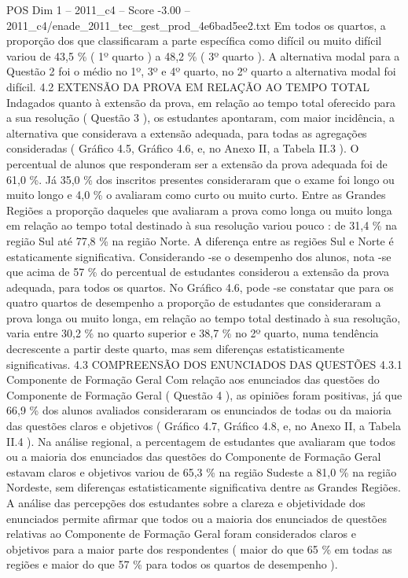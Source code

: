 \begin{textsample}{POS Dim 1 – 2011\_c4 – Score -3.00 – 2011\_c4/enade\_2011\_tec\_gest\_prod\_4e6bad5ee2.txt}
Em todos os quartos, a proporção dos que classificaram a parte específica como difícil ou muito difícil variou de 43,5 \% ( 1º quarto ) a 48,2 \% ( 3º quarto ).
A alternativa modal para a Questão 2 foi o médio no 1º, 3º e 4º quarto, no 2º quarto a alternativa modal foi difícil. 4.2 EXTENSÃO DA PROVA EM RELAÇÃO AO TEMPO TOTAL Indagados quanto à extensão da prova, em relação ao tempo total oferecido para a sua resolução ( Questão 3 ), os estudantes apontaram, com maior incidência, a alternativa que considerava a extensão adequada, para todas as agregações consideradas ( Gráfico 4.5, Gráfico 4.6, e, no Anexo II, a Tabela II.3 ).
O percentual de alunos que responderam ser a extensão da prova adequada foi de 61,0 \%.
Já 35,0 \% dos inscritos presentes consideraram que o exame foi longo ou muito longo e 4,0 \% o avaliaram como curto ou muito curto.
Entre as Grandes Regiões a proporção daqueles que avaliaram a prova como longa ou muito longa em relação ao tempo total destinado à sua resolução variou pouco : de 31,4 \% na região Sul até 77,8 \% na região Norte.
A diferença entre as regiões Sul e Norte é estaticamente significativa.
Considerando -se o desempenho dos alunos, nota -se que acima de 57 \% do percentual de estudantes considerou a extensão da prova adequada, para todos os quartos.
No Gráfico 4.6, pode -se constatar que para os quatro quartos de desempenho a proporção de estudantes que consideraram a prova longa ou muito longa, em relação ao tempo total destinado à sua resolução, varia entre 30,2 \% no quarto superior e 38,7 \% no 2º quarto, numa tendência decrescente a partir deste quarto, mas sem diferenças estatisticamente significativas. 4.3 COMPREENSÃO DOS ENUNCIADOS DAS QUESTÕES 4.3.1 Componente de Formação Geral Com relação aos enunciados das questões do Componente de Formação Geral ( Questão 4 ), as opiniões foram positivas, já que 66,9 \% dos alunos avaliados consideraram os enunciados de todas ou da maioria das questões claros e objetivos ( Gráfico 4.7, Gráfico 4.8, e, no Anexo II, a Tabela II.4 ).
Na análise regional, a percentagem de estudantes que avaliaram que todos ou a maioria dos enunciados das questões do Componente de Formação Geral estavam claros e objetivos variou de 65,3 \% na região Sudeste a 81,0 \% na região Nordeste, sem diferenças estatisticamente significativa dentre as Grandes Regiões.
A análise das percepções dos estudantes sobre a clareza e objetividade dos enunciados permite afirmar que todos ou a maioria dos enunciados de questões relativas ao Componente de Formação Geral foram considerados claros e objetivos para a maior parte dos respondentes ( maior do que 65 \% em todas as regiões e maior do que 57 \% para todos os quartos de desempenho ).

\end{textsample}
